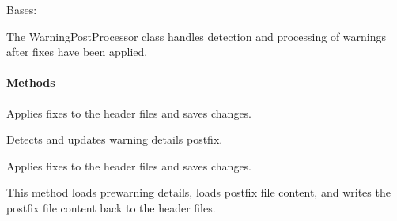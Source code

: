 \documentclass[letterpaper,10pt,english]{sphinxmanual}
\begin{document}
\begin{fulllineitems}
\label{\detokenize{main.doxy_warning_post_processor:main.doxy_warning_post_processor.doxy_warning_post_processor.WarningPostProcessor}}
\pysigstartsignatures
{}
\pysigstopsignatures
\sphinxAtStartPar
Bases: 

\sphinxAtStartPar
The WarningPostProcessor class handles detection and processing of warnings after fixes have been applied.


\paragraph{Methods}
\label{\detokenize{main.doxy_warning_post_processor:methods}}\begin{description}
\sphinxAtStartPar
Applies fixes to the header files and saves changes.

\sphinxAtStartPar
Detects and updates warning details post\sphinxhyphen{}fix.

\end{description}

\begin{fulllineitems}
\label{\detokenize{main.doxy_warning_post_processor:main.doxy_warning_post_processor.doxy_warning_post_processor.WarningPostProcessor.apply_fix}}
\pysigstartsignatures
{}
\pysigstopsignatures
\sphinxAtStartPar
Applies fixes to the header files and saves changes.

\sphinxAtStartPar
This method loads pre\sphinxhyphen{}warning details, loads post\sphinxhyphen{}fix file content, and writes the post\sphinxhyphen{}fix file
content back to the header files.

\end{fulllineitems}



\end{fulllineitems}
\end{document}
